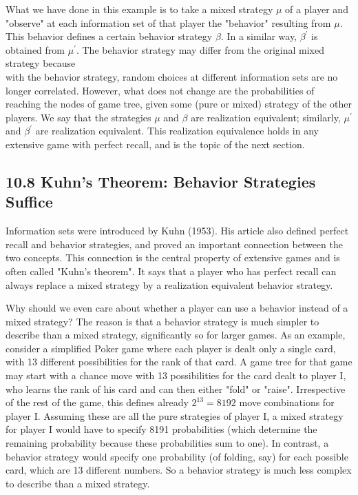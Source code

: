 \documentclass[12pt]{article}
\begin{document}
What we have done in this example is to take a mixed strategy $\mu$ of a player and "observe" at each information set of that player the "behavior" resulting from $\mu$. This behavior defines a certain behavior strategy $\beta$. In a similar way, $\beta^{\prime}$ is obtained from $\mu^{\prime}$. The behavior strategy may differ from the original mixed strategy because\\
with the behavior strategy, random choices at different information sets are no longer correlated. However, what does not change are the probabilities of reaching the nodes of game tree, given some (pure or mixed) strategy of the other players. We say that the strategies $\mu$ and $\beta$ are realization equivalent; similarly, $\mu^{\prime}$ and $\beta^{\prime}$ are realization equivalent. This realization equivalence holds in any extensive game with perfect recall, and is the topic of the next section.

\subsection*{10.8 Kuhn's Theorem: Behavior Strategies Suffice}
Information sets were introduced by Kuhn (1953). His article also defined perfect recall and behavior strategies, and proved an important connection between the two concepts. This connection is the central property of extensive games and is often called "Kuhn's theorem". It says that a player who has perfect recall can always replace a mixed strategy by a realization equivalent behavior strategy.

Why should we even care about whether a player can use a behavior instead of a mixed strategy? The reason is that a behavior strategy is much simpler to describe than a mixed strategy, significantly so for larger games. As an example, consider a simplified Poker game where each player is dealt only a single card, with 13 different possibilities for the rank of that card. A game tree for that game may start with a chance move with 13 possibilities for the card dealt to player I, who learns the rank of his card and can then either "fold" or "raise". Irrespective of the rest of the game, this defines already $2^{13}=8192$ move combinations for player I. Assuming these are all the pure strategies of player I, a mixed strategy for player I would have to specify 8191 probabilities (which determine the remaining probability because these probabilities sum to one). In contrast, a behavior strategy would specify one probability (of folding, say) for each possible card, which are 13 different numbers. So a behavior strategy is much less complex to describe than a mixed strategy.
\end{document}
